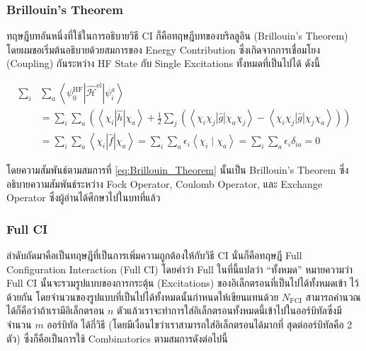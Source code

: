 \subsubsection{Brillouin's Theorem}

ทฤษฎีบทอันหนึ่งที่ใช้ในการอธิบายวิธี CI ก็คือทฤษฎีบทของบริลลูอิน (Brillouin's Theorem) โดยผมขอเริ่มต้นอธิบายด้วยสมการของ Energy
Contribution ซึ่งเกิดจากการเชื่อมโยง (Coupling) กันระหว่าง HF State กับ Single Excitations ทั้งหมดที่เป็นไปได้ ดังนี้

\begin{equation}
    \label{eq:Brillouin_Theorem}
    \begin{aligned}
        \sum_i & \sum_a
        \left\langle\psi_0^{\mathrm{HF}}
        \left| \hat{\mathscr{H}}^{\mathrm{el}} \right|
        \psi_i^a\right\rangle                                                         \\
               & = \sum_i \sum_a\left(\left\langle\chi_i|\hat{h}| \chi_a\right\rangle
        + \frac{1}{2} \sum_j\left(\left\langle\chi_i \chi_j|\hat{g}| \chi_a \chi_j\right\rangle
        - \left\langle\chi_i \chi_j|\hat{g}| \chi_j \chi_a\right\rangle\right)\right) \\
               & = \sum_i \sum_a\left\langle\chi_i|\hat{f}| \chi_a\right\rangle
        = \sum_i \sum_a \epsilon_i\left\langle\chi_i \mid \chi_a\right\rangle
        = \sum_i \sum_a \epsilon_i \delta_{i a}
        = 0
    \end{aligned}
\end{equation}

\noindent โดยความสัมพันธ์ตามสมการที่ \ref{eq:Brillouin_Theorem} นั้นเป็น Brillouin's Theorem ซึ่งอธิบายความสัมพันธ์ระหว่าง
Fock Operator, Coulomb Operator, และ Exchange Operator ซึ่งผู้อ่านได้ศึกษาไปในบทที่แล้ว

\subsubsection{Full CI}

ลำดับถัดมาคือเป็นทฤษฎีที่เป็นการเพิ่มความถูกต้องให้กับวิธี CI นั่นก็คือทฤษฎี Full Configuration Interaction (Full CI) โดยคำว่า Full
ในที่นี้แปลว่า \enquote{ทั้งหมด} หมายความว่า Full CI นั้นจะรวมรูปแบบของการกระตุ้น (Excitations) ของอิเล็กตรอนที่เป็นไปได้ทั้งหมดเข้า%
ไว้ด้วยกัน โดยจำนวนของรูปแบบที่เป็นไปได้ทั้งหมดนั้นกำหนดให้เขียนแทนด้วย $N_{\mathrm{FCI}}$ สามารถคำนวณได้ก็คือว่าถ้าเรามีอิเล็กตรอน
$n$ ตัวแล้วเราจะทำการใส่อิเล็กตรอนทั้งหมดนี้เข้าไปในออร์บิทัลซึ่งมีจำนวน $m$ ออร์บิทัล ได้กี่วิธี (โดยมีเงื่อนไขว่าเราสามารถใส่อิเล็กตรอนได้มากที่%
สุดต่ออร์บิทัลคือ 2 ตัว) ซึ่งก็คือเป็นการใช้ Combinatorics ตามสมการดังต่อไปนี้

